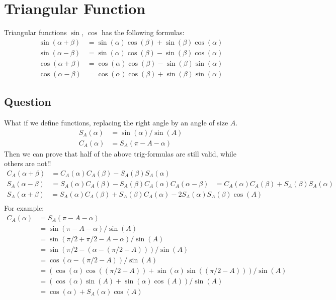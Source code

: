 \documentclass[pdf]{article}
\begin{document}
\section{Triangular Function}
Triangular functions $\sin$, $\cos$ has the following formulas:
\begin{align*}
\sin(\alpha + \beta) &= \sin(\alpha)\cos(\beta) + \sin(\beta)\cos(\alpha)\\
\sin(\alpha - \beta) &= \sin(\alpha)\cos(\beta) - \sin(\beta)\cos(\alpha)\\
\cos(\alpha + \beta) &= \cos(\alpha)\cos(\beta) - \sin(\beta)\sin(\alpha)\\
\cos(\alpha - \beta) &= \cos(\alpha)\cos(\beta) + \sin(\beta)\sin(\alpha)
\end{align*}
\subsection{Question}
What if we define functions, replacing the right angle by an angle of size $A$.
\begin{align*}
S_A(\alpha) &= \sin(\alpha)/\sin(A)\\
C_A(\alpha) &= S_A(\pi - A - \alpha)
\end{align*}
Then we can prove that half of the above trig-formulas are still valid, while others are not!!
\begin{align*}
C_A(\alpha + \beta) &= C_A(\alpha)C_A(\beta) - S_A(\beta)S_A(\alpha)\\
S_A(\alpha - \beta) &= S_A(\alpha)C_A(\beta) - S_A(\beta)C_A(\alpha)
C_A(\alpha - \beta) &= C_A(\alpha)C_A(\beta) + S_A(\beta)S_A(\alpha)
\end{align*}
\begin{align*}
S_A(\alpha + \beta) &= S_A(\alpha)C_A(\beta) + S_A(\beta)C_A(\alpha) - 2S_A(\alpha)S_A(\beta)\cos(A)\\
\end{align*}
For example:
\begin{align*}
C_A(\alpha) &= S_A(\pi - A - \alpha)\\
                    &= \sin(\pi - A - \alpha)/\sin(A)\\
                    &= \sin(\pi/2 + \pi/2 - A - \alpha)/\sin(A)\\
                    &= \sin(\pi/2 - (\alpha - (\pi/2 - A)))/\sin(A)\\
                    &= \cos(\alpha - (\pi/2 - A))/\sin(A)\\
                    &= ( \cos(\alpha)\cos((\pi/2 - A)) + \sin(\alpha)\sin((\pi/2 - A)) )/\sin(A)\\
                    &= ( \cos(\alpha)\sin(A) + \sin(\alpha)\cos(A) )/\sin(A)\\
                    &= \cos(\alpha) + S_A(\alpha)\cos(A)
\end{align*}
\end{document}
